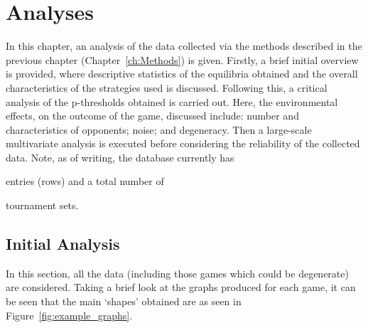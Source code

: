 \chapter{Analyses}\label{ch:Analyses}
In this chapter, an analysis of the data collected via the methods described in
the previous chapter (Chapter~\ref{ch:Methods}) is given. Firstly, a brief
initial overview is provided, where descriptive statistics of the equilibria
obtained and the overall characteristics of the strategies used is discussed.
Following this, a critical analysis of the p-thresholds obtained is carried out.
Here, the environmental effects, on the outcome of the game, discussed include:
number and characteristics of opponents; noise; and degeneracy. Then a
large-scale multivariate analysis is executed before considering the reliability
of the collected data. Note, as of writing, the database currently has 

entries (rows) and a total number of 

tournament sets. 

\section{Initial Analysis}\label{sec:Initial_Analysis}
In this section, all the data (including those games which could be degenerate)
are considered. Taking a brief look at the graphs produced for each game, it can
be seen that the main `shapes' obtained are as seen in
Figure~\ref{fig:example_graphs}.

